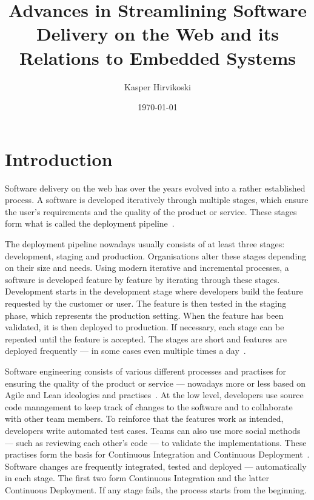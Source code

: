 \documentclass[english]{tktltiki2}
\title{Advances in Streamlining Software Delivery on the Web and its Relations to Embedded Systems}
\author{Kasper Hirvikoski}
\date{\today}
\begin{document}

\frontmatter

\maketitle
\makeabstract

\tableofcontents


\mainmatter


\section{Introduction}

Software delivery on the web has over the years evolved into a rather established process. A software is developed iteratively through multiple stages, which ensure the user’s requirements and the quality of the product or service. These stages form what is called the deployment pipeline~\cite{Fow06, HF11, Fow13a, Fow13b}.

The deployment pipeline nowadays usually consists of at least three stages: development, staging and production. Organisations alter these stages depending on their size and needs. Using modern iterative and incremental processes, a software is developed feature by feature by iterating through these stages. Development starts in the development stage where developers build the feature requested by the customer or user. The feature is then tested in the staging phase, which represents the production setting. When the feature has been validated, it is then deployed to production. If necessary, each stage can be repeated until the feature is accepted. The stages are short and features are deployed frequently — in some cases even multiple times a day~\cite{OR11, Sny13, Rub14}.

Software engineering consists of various different processes and practises for ensuring the quality of the product or service — nowadays more or less based on Agile and Lean ideologies and practises~\cite{BBB01, Fow05, Mon12}. At the low level, developers use source code management to keep track of changes to the software and to collaborate with other team members. To reinforce that the features work as intended, developers write automated test cases. Teams can also use more social methods — such as reviewing each other’s code — to validate the implementations. These practises form the basis for Continuous Integration and Continuous Deployment~\cite{Fow06, HF11, Fow13a, Fow13b}. Software changes are frequently integrated, tested and deployed — automatically in each stage. The first two form Continuous Integration and the latter Continuous Deployment. If any stage fails, the process starts from the beginning.
\end{document}
